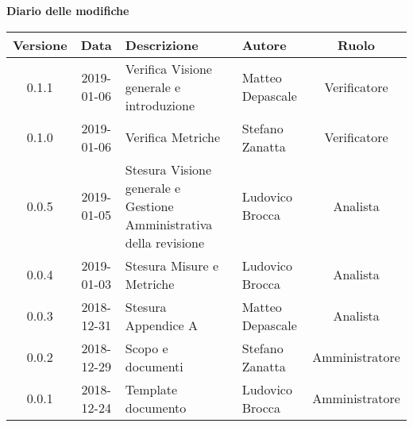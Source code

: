	\begin{center}
		\textbf{Diario delle modifiche}
	\end{center}
	\begin{center}
		\begin{tabularx}{\textwidth}{|c|c|X|X|c|}
			\hline
			\textbf{Versione} & \textbf{Data} & \textbf{Descrizione} & \textbf{Autore} & \textbf{Ruolo} \\
			\hline
			0.1.1 & 2019-01-06 & Verifica Visione generale e introduzione & Matteo Depascale & Verificatore\\
			\hline
			0.1.0 & 2019-01-06 & Verifica Metriche & Stefano Zanatta & Verificatore\\
			\hline
			0.0.5 & 2019-01-05 & Stesura Visione generale e Gestione Amministrativa della revisione  & Ludovico Brocca& Analista\\
			\hline	
			0.0.4 & 2019-01-03& Stesura Misure e Metriche &Ludovico Brocca & Analista\\
			\hline
			0.0.3 & 2018-12-31 & Stesura Appendice A & Matteo Depascale & Analista\\
			\hline
			0.0.2 & 2018-12-29 & Scopo e documenti & Stefano Zanatta & Amministratore\\
			\hline
			0.0.1 & 2018-12-24 & Template documento & Ludovico Brocca & Amministratore\\
			\hline
		\end{tabularx}
	\end{center}
\newpage
